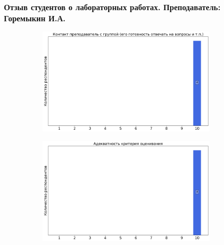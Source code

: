 	\subsubsection{Отзыв студентов о лабораторных работах. Преподаватель: Горемыкин И.А.}
		\begin{figure}[H]
			\centering
			\begin{subfigure}[b]{0.45\textwidth}
				\centering
				\includegraphics[width=\textwidth]{images/2 course/Общая физика - электричество и магнетизм/labniks-marks-Горемыкин И.А.-0.png}
			\end{subfigure}
			\begin{subfigure}[b]{0.45\textwidth}
				\centering
				\includegraphics[width=\textwidth]{images/2 course/Общая физика - электричество и магнетизм/labniks-marks-Горемыкин И.А.-1.png}
			\end{subfigure}
			\begin{subfigure}[b]{0.45\textwidth}
				\centering

\end{subfigure}
\end{figure}
